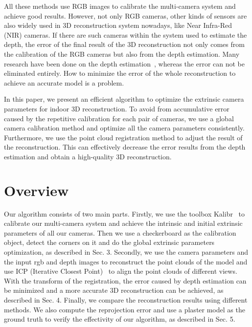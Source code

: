 All these methods use RGB images to calibrate the multi-camera system and achieve good results. However, not only RGB cameras, other kinds of sensors are also widely used in 3D reconstruction system nowadays, like Near Infra-Red (NIR) cameras. If there are such cameras within the system used to estimate the depth, the error of the final result of the 3D reconstruction not only comes from the calibration of the RGB cameras but also from the depth estimation. Many research have been done on the depth estimation~\cite{scharstein,Bleyer2011PatchMatch}, whereas the error can not be eliminated entirely. How to minimize the error of the whole reconstruction to achieve an accurate model is a problem.

In this paper, we present an efficient algorithm to optimize the extrinsic camera parameters for indoor 3D reconstruction. To avoid from accumulative error caused by the repetitive calibration for each pair of cameras, we use a global camera calibration method and optimize all the camera parameters consistently. Furthermore, we use the point cloud registration method to adjust the result of the reconstruction. This can effectively decrease the error results from the depth estimation and obtain a high-quality 3D reconstruction.


\section{Overview}
Our algorithm consists of two main parts. Firstly, we use the toolbox Kalibr~\cite{Maye2013Self} to calibrate our multi-camera system and achieve the intrinsic and initial extrinsic parameters of all our cameras. Then we use a checkerboard as the calibration object, detect the corners on it and do the global extrinsic parameters optimization, as described in Sec. 3. Secondly, we use the camera parameters and the input rgb and depth images to reconstruct the point clouds of the model and use ICP (Iterative Closest Point)~\cite{Besl1992A} to align the point clouds of different views. With the transform of the registration, the error caused by depth estimation can be minimized and a more accurate 3D reconstruction can be achieved, as described in Sec. 4. Finally, we compare the reconstruction results using different methods. We also compute the reprojection error and use a plaster model as the ground truth to verify the effectivity of our algorithm, as described in Sec. 5.
